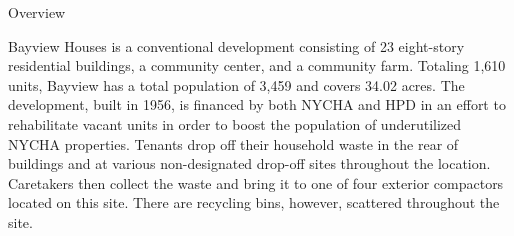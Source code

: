 Overview

Bayview Houses is a conventional development consisting of 23 eight-story residential buildings, a community center, and a community farm. Totaling 1,610 units, Bayview has a total population of 3,459 and covers 34.02 acres. The development, built in 1956, is financed by both NYCHA and HPD in an effort to rehabilitate vacant units in order to boost the population of underutilized NYCHA properties. Tenants drop off their household waste in the rear of buildings and at various non-designated drop-off sites throughout the location. Caretakers then collect the waste and bring it to one of four exterior compactors located on this site. There are recycling bins, however, scattered throughout the site.